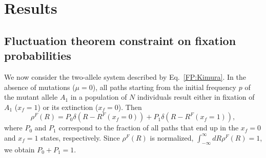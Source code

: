 \documentclass[9pt,twocolumn,twoside]{gsajnl}
\begin{document}



\section{Results}

\subsection{Fluctuation theorem constraint on fixation probabilities}
We now consider the two-allele system described by Eq.~\eqref{FP:Kimura}. In the absence of mutations ($\mu = 0$), all paths starting from the initial frequency $p$ of the mutant allele $A_1$ in a population
of $N$ individuals result either in fixation of $A_1$ ($x_f = 1$) or its extinction ($x_f = 0$). Then
\begin{equation} \label{rho:F}
\rho^F (R) = P_0 \delta (R - R^{F} (x_f = 0)) + P_1 \delta (R - R^{F} (x_f = 1)),
\end{equation}
where $P_0$ and $P_1$ correspond to the fraction of all paths that end up in the $x_f = 0$ and $x_f = 1$ states, respectively. Since $\rho^F (R)$ is normalized,
$\int_{-\infty}^{\infty} dR \rho^F (R) = 1$, we obtain $P_0 + P_1 = 1$.
\end{document}
